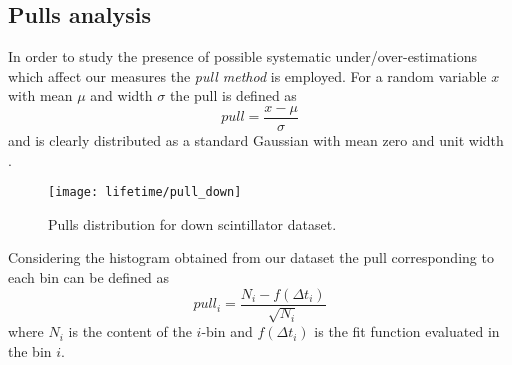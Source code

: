 

\subsection{Pulls analysis}

In order to study the presence of possible systematic under/over-estimations which affect our measures the \emph{pull method} is employed. For a random variable $x$ with mean $\mu$ and width $\sigma$ the pull is defined as 
\begin{equation}
pull = \frac{ x - \mu }{\sigma}
\end{equation} and is clearly distributed as a standard Gaussian with mean zero and unit width \cite{pull}.
\begin{figure}[!htp]
	\centering
	\texttt{[image: lifetime/pull\_down]}
	\caption{Pulls distribution for down scintillator dataset.}
	\label{fig:a}
\end{figure}
Considering the histogram obtained from our dataset the pull corresponding to each bin can be defined as
\begin{equation}
pull_i = \frac{N_{i} - f(\Delta t_{i})}{\sqrt{N_{i}}}
\end{equation}
where $N_i$ is the content of the $i$-bin and $f(\Delta t_{i})$ is the fit function evaluated in the bin $i$.\\

